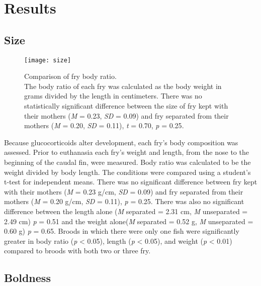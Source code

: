 \documentclass[12pt,twoside]{reedthesis}
\begin{document}
\chapter{Results}
\section{Size}

\begin{figure}[htbp] 
\begin{center} 
\texttt{[image: size]}
\caption[Comparison of fry size]{\footnotesize{Comparison of fry body
      ratio. \\ The body ratio of each fry
    was calculated as the body weight in grams divided by the length in
    centimeters. There was no
    statistically significant difference between the size of fry kept with their
    mothers (\textit{M} = 0.23, \textit{SD} = 0.09) and fry separated from their
  mothers (\textit{M} = 0.20, \textit{SD} = 0.11), \textit{t} = 0.70, \textit{p}
= 0.25}.}
\label{subd}
\end{center} 
\end{figure}

Because glucocorticoids alter development, each
fry's body
composition was assessed. Prior to euthanasia each fry's weight and length, from the nose to the beginning of
the caudal fin, were measured. 
Body ratio was calculated to be the weight divided by body length. The conditions were
compared using a student's t-test for independent means. There was no
significant difference between fry kept with their mothers (\textit{M} = 0.23 g/cm,
\textit{SD} = 0.09) and fry separated from their mothers (\textit{M} = 0.20 g/cm,
\textit{SD} = 0.11), \textit{p} = 0.25. There was also no
significant difference between the length alone (\textit{M} separated = 2.31 cm,
\textit{M} unseparated = 2.49 cm) \textit{p} = 0.51 and the weight
alone(\textit{M} separated = 0.52 g, \textit{M} unseparated = 0.60 g) \textit{p}
= 0.65. Broods in which there were only one fish were significantly greater in
body ratio (\textit{p} < 0.05), length (\textit{p} < 0.05), and weight
(\textit{p} < 0.01) compared to broods with both two or three fry.

\section{Boldness}
\end{document}
